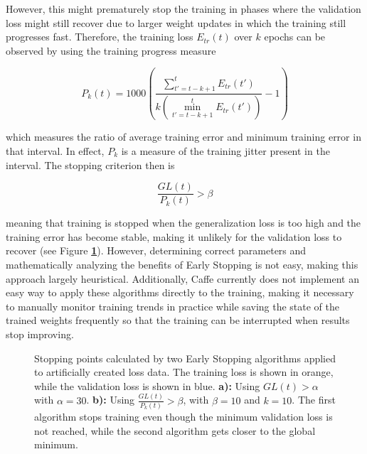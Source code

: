 However, this might prematurely stop the training in phases where the validation loss might still recover due to larger weight updates in which the training still progresses fast. Therefore, the training loss $E_{tr}(t)$ over $k$ epochs can be observed by using the training progress measure

\[ P_k(t) = 1000 \left ( \frac{\sum_{t' = t - k + 1}^{t} E_{tr}(t')}{k (\min_{t' = t - k + 1}^{t} E_{tr}(t'))} - 1 \right ) \]

\noindent which measures the ratio of average training error and minimum training error in that interval. In effect, $P_k$ is a measure of the training jitter present in the interval. The stopping criterion then is 

\[ \frac{GL(t)}{P_k(t)} > \beta \]

\noindent meaning that training is stopped when the generalization loss is too high and the training error has become stable, making it unlikely for the validation loss to recover (see Figure \textbf{\ref{fig:early_stopping}}). However, determining correct parameters and mathematically analyzing the benefits of Early Stopping is not easy, making this approach largely heuristical. Additionally, Caffe currently does not implement an easy way to apply these algorithms directly to the training, making it necessary to manually monitor training trends in practice while saving the state of the trained weights frequently so that the training can be interrupted when results stop improving.


\begin {figure}[!ht]
	\begin{center}
		\scalebox{0.7}{}
	\end{center}
	\caption[Early stopping.]{Stopping points calculated by two Early Stopping algorithms applied to artificially created loss data. The training loss is shown in orange, while the validation loss is shown in blue. \textbf{a):} Using $GL(t) > \alpha$ with $\alpha = 30$. \textbf{b):} Using $\frac{GL(t)}{P_k(t)} > \beta$, with $\beta = 10$ and $k = 10$. The first algorithm stops training even though the minimum validation loss is not reached, while the second algorithm gets closer to the global minimum. }
	\label{fig:early_stopping}
\end {figure}


